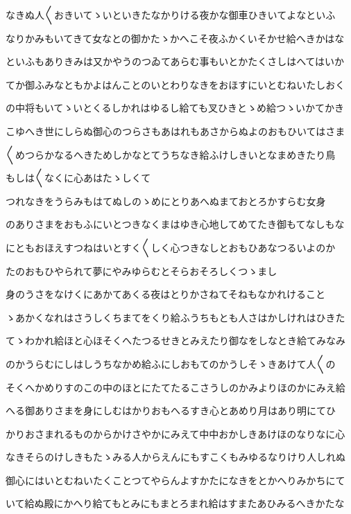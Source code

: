 \documentclass[a4paper,11pt,landscape]{ltjtarticle}
\begin{document}
なきぬ人〱おきいてゝいといきたなかりける夜かな御車ひきいてよなといふ
\par\medskip
なりかみもいてきて女なとの御かたゝかへこそ夜ふかくいそかせ給へきかはな
\par\medskip
といふもありきみは又かやうのつゐてあらむ事もいとかたくさしはへてはいか
\par\medskip
てか御ふみなともかよはんことのいとわりなきをおほすにいとむねいたしおく
\par\medskip
の中将もいてゝいとくるしかれはゆるし給ても叉ひきとゝめ給つゝいかてかき
\par\medskip
こゆへき世にしらぬ御心のつらさもあはれもあさからぬよのおもひいてはさま
\par\medskip
〱めつらかなるへきためしかなとてうちなき給ふけしきいとなまめきたり鳥
\par\medskip
もしは〱なくに心あはたゝしくて
\par\medskip
つれなきをうらみもはてぬしのゝめにとりあへぬまておとろかすらむ女身
\par\medskip
のありさまをおもふにいとつきなくまはゆき心地してめてたき御もてなしもな
\par\medskip
にともおほえすつねはいとすく〱しく心つきなしとおもひあなつるいよのか
\par\medskip
たのおもひやられて夢にやみゆらむとそらおそろしくつゝまし
\par\medskip
身のうさをなけくにあかてあくる夜はとりかさねてそねもなかれけること
\par\medskip
ゝあかくなれはさうしくちまてをくり給ふうちもとも人さはかしけれはひきた
\par\medskip
てゝわかれ給ほと心ほそくへたつるせきとみえたり御なをしなとき給てみなみ
\par\medskip
のかうらむにしはしうちなかめ給ふにしおもてのかうしそゝきあけて人〱の
\par\medskip
そくへかめりすのこの中のほとにたてたるこさうしのかみよりほのかにみえ給
\par\medskip
へる御ありさまを身にしむはかりおもへるすき心とあめり月はあり明にてひ
\par\medskip
かりおさまれるものからかけさやかにみえて中中おかしきあけほのなりなに心
\par\medskip
なきそらのけしきもたゝみる人からえんにもすこくもみゆるなりけり人しれぬ
\par\medskip
御心にはいとむねいたくことつてやらんよすかたになきをとかへりみかちにて
\par\medskip
いて給ぬ殿にかへり給てもとみにもまとろまれ給はすまたあひみるへきかたな
\end{document}
